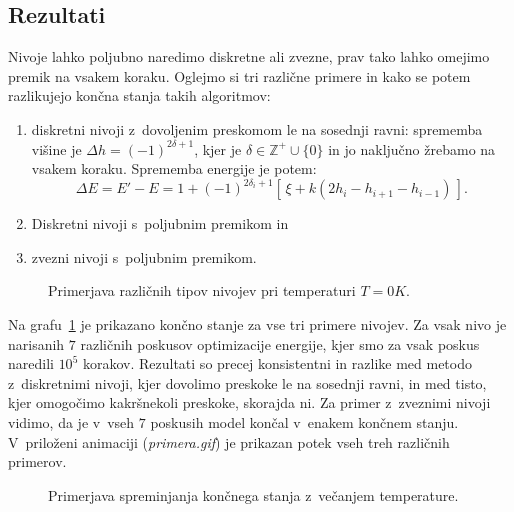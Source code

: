 \documentclass[a4paper,pdftex,10pt]{article}
\numberwithin{figure}{section} %
\begin{document}
\subsection{Rezultati}
Nivoje lahko poljubno naredimo diskretne ali zvezne, prav tako lahko omejimo premik
na vsakem koraku. Oglejmo si tri različne primere in kako se potem razlikujejo končna
stanja takih algoritmov:
\begin{enumerate}
    \item diskretni nivoji z~dovoljenim preskomom le na sosednji ravni: sprememba višine je
	$\Delta h =  (-1)^{2 \delta + 1}$, kjer je $\delta \in \mathds{Z}^+ \! \cup \!  
	\{0\}$ in jo naključno žrebamo na vsakem koraku. Sprememba energije je potem: 
	\begin{equation} 
	    \Delta E = E' - E = 1 + (-1)^{2 \delta_i + 1} \left[ \, \xi + k \left(2 h_i - 
	    h_{i+1} - h_{i-1} \right) \, \right].
	\end{equation}
    \item Diskretni nivoji s~poljubnim premikom in 
    \item zvezni nivoji s~poljubnim premikom.
\end{enumerate}

\begin{figure}    
    \centering
    \resizebox{0.75\linewidth}{!}{}
    \caption{Primerjava različnih tipov nivojev pri temperaturi $T=0K$.}
    \label{slika1}
\end{figure}


Na grafu~\ref{slika1} je prikazano končno stanje za vse tri primere nivojev. Za vsak nivo
je narisanih $7$ različnih poskusov optimizacije energije, kjer smo za vsak poskus naredili 
$10^5$ korakov. Rezultati so precej konsistentni in razlike med metodo z~diskretnimi nivoji,
kjer dovolimo preskoke le na sosednji ravni, in med tisto, kjer omogočimo kakršnekoli 
preskoke, skorajda ni. Za primer z~zveznimi nivoji vidimo, da je v~vseh $7$ poskusih model
končal v~enakem končnem stanju. V~priloženi animaciji (\emph{primera.gif}) je prikazan 
potek vseh treh različnih primerov.

\begin{figure}    
    \begin{minipage}{\linewidth} 
	\centering 
	\resizebox{0.75\linewidth}{!}{} 
    \end{minipage}

    \begin{minipage}{\linewidth} 
	\centering
	\resizebox{0.75\linewidth}{!}{} 
    \end{minipage}

    \begin{minipage}{\linewidth} 
	\centering
	\resizebox{0.75\linewidth}{!}{} 
    \end{minipage}

    \caption{Primerjava spreminjanja končnega stanja z~večanjem temperature.}
    \label{slika2}
\end{figure}
\end{document}
